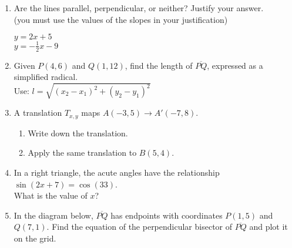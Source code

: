 \begin{enumerate}
\newpage
\item Are the lines parallel, perpendicular, or neither? Justify your answer. \\(you must use the values of the slopes in your justification)
  \begin{multicols}{2}
    $y = 2x+5$ \\
    $y = -\frac{1}{2}x-9$
  \end{multicols} \vspace{2cm}

\item Given $P(4,6)$ and $Q(1,12)$, find the length of $\overline{PQ}$, expressed as a simplified radical.\\[0.25cm]
Use: $l=\sqrt{(x_2-x_1)^2+(y_2-y_1)^2}$
    \vspace{6cm}

\item A translation $T_{x,y}$ maps $A(-3,5) \rightarrow A'(-7,8)$. 
\begin{enumerate}
  \item Write down the translation. \vspace{1cm}
  \item Apply the same translation to $B(5, 4)$.
\end{enumerate} \vspace{1.5cm}

\item In a right triangle, the acute angles have the relationship $\sin(2x + 7) =\cos (33)$. \\[0.25cm]
What is the value of $x$?

\newpage
\item In the diagram below, $\overline{PQ}$ has endpoints with coordinates $P(1,5)$ and $Q(7,1)$. Find the equation of the perpendicular bisector of $\overline{PQ}$ and plot it on the grid.
  \begin{flushright}
  \end{flushright} \vspace{3cm}


\end{enumerate}
